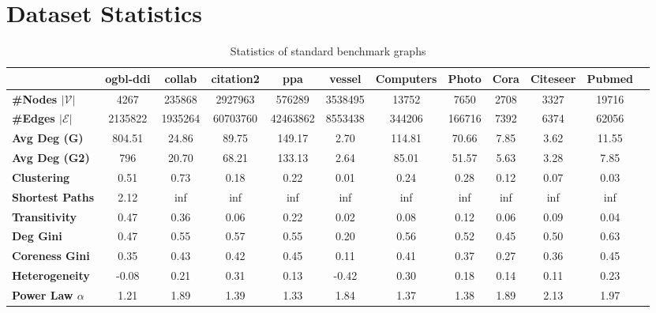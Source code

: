 \section{Dataset Statistics}
\begin{table*}[ht]
    \centering
    \caption{Statistics of standard benchmark graphs}
    \begin{adjustbox}{width=\textwidth}
    \begin{tabular}{lccccccccccc}
        \toprule 
        & \textbf{ogbl-ddi} & \textbf{collab} & \textbf{citation2} & \textbf{ppa} & \textbf{vessel} & \textbf{Computers} & \textbf{Photo} & \textbf{Cora} & \textbf{Citeseer} & \textbf{Pubmed} \\
        \midrule
        \textbf{\#Nodes $|\mathcal{V}|$} & 4267 & 235868 & 2927963 & 576289 & 3538495 & 13752 & 7650 & 2708 & 3327 & 19716 \\
        \textbf{\#Edges $|\mathcal{E}|$} & 2135822 & 1935264 & 60703760 & 42463862 & 8553438 & 344206 & 166716 & 7392 & 6374 & 62056 \\
        \textbf{Avg Deg (G)} & 804.51 & 24.86 & 89.75 & 149.17 & 2.70 & 114.81 & 70.66 & 7.85 & 3.62 & 11.55 \\
        \textbf{Avg Deg (G2)} & 796 & 20.70 & 68.21 & 133.13 & 2.64 & 85.01 & 51.57 & 5.63 & 3.28 & 7.85 \\
        \textbf{Clustering} & 0.51 & 0.73 & 0.18 & 0.22 & 0.01 & 0.24 & 0.28 & 0.12 & 0.07 & 0.03 \\
        \textbf{Shortest Paths} & 2.12 & inf & inf & inf & inf & inf & inf & inf & inf & inf \\
        \textbf{Transitivity} & 0.47 & 0.36 & 0.06 & 0.22 & 0.02 & 0.08 & 0.12 & 0.06 & 0.09 & 0.04 \\
        \textbf{Deg Gini} & 0.47 & 0.55 & 0.57 & 0.55 & 0.20 & 0.56 & 0.52 & 0.45 & 0.50 & 0.63 \\
        \textbf{Coreness Gini} & 0.35 & 0.43 & 0.42 & 0.45 & 0.11 & 0.41 & 0.37 & 0.27 & 0.36 & 0.45 \\
        \textbf{Heterogeneity} & -0.08 & 0.21 & 0.31 & 0.13 & -0.42 & 0.30 & 0.18 & 0.14 & 0.11 & 0.23 \\
        \textbf{Power Law $\alpha$} & 1.21 & 1.89 & 1.39 & 1.33 & 1.84 & 1.37 & 1.38 & 1.89 & 2.13 & 1.97 \\
        \bottomrule
    \end{tabular}
    \end{adjustbox}
    \label{tab:graph-stats}
\end{table*}

